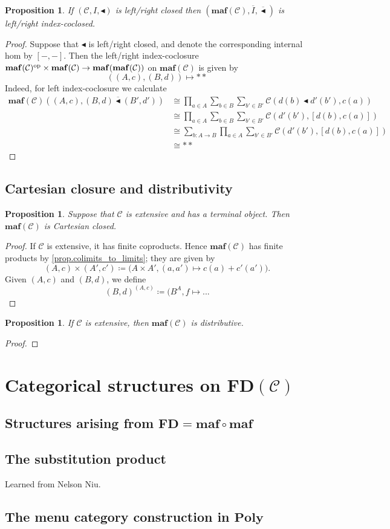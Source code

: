 \documentclass[11pt, one side, article]{memoir}
\theoremstyle{definition}
\theoremstyle{plain}
\newtheorem{proposition}[definitionx]{Proposition}
\newcommand{\cat}[1]{\mathcal{#1}}%
\newcommand{\Cat}[1]{\mathbf{#1}}%
\newcommand{\op}{^\tn{op}}
\newcommand{\tn}[1]{\textnormal{#1}}
\newcommand{\ol}[1]{\overline{#1}}
\newcommand{\poly}{\Cat{Poly}}
\newcommand{\0}{\Cat{0}}
\newcommand{\1}{\Cat{1}}
\newcommand{\olmonprod}{\mathbin{\ol{\monprod}}}
\newcommand{\monprod}{\blacktriangleleft}
\newcommand{\fd}{\Cat{FD}}
\newcommand{\opfam}{\Cat{maf}}
\begin{document}
\begin{proposition}
If $(\cat{C},I,\monprod)$ is left/right closed then $(\opfam(\cat{C}),\ol{I},\olmonprod)$ is left/right index-coclosed.
\end{proposition}
\begin{proof}
Suppose that $\monprod$ is left/right closed, and denote the corresponding internal hom by $[-,-]$. Then the left/right index-coclosure $\opfam(\cat{C})\op\times\opfam(\cat{C})\to\opfam(\opfam(\cat{C}))$ on $\opfam(\cat{C})$ is given by
\[
((A,c),(B,d))\mapsto**
\]
Indeed, for left index-coclosure we calculate
\begin{align*}
  \opfam(\cat{C})((A,c),(B,d)\olmonprod(B',d'))&\cong
  \prod_{a\in A}\sum_{b\in B}\sum_{b'\in B'}\cat{C}(d(b)\monprod d'(b'), c(a))\\&\cong
  \prod_{a\in A}\sum_{b\in B}\sum_{b'\in B'}\cat{C}(d'(b'), [d(b),c(a)])\\&\cong
  \sum_{b\colon A\to B}\prod_{a\in A}\sum_{b'\in B'}\cat{C}(d'(b'), [d(b),c(a)])\\&\cong
**
\end{align*}
\end{proof}

\section{Cartesian closure and distributivity}

\begin{proposition}
Suppose that $\cat{C}$ is extensive and has a terminal object. Then $\opfam(\cat{C})$ is Cartesian closed.
\end{proposition}
\begin{proof}
If $\cat{C}$ is extensive, it has finite coproducts. Hence $\opfam(\cat{C})$ has finite products by \cref{prop.colimits_to_limits}; they are given by
\[
(A,c)\times (A',c')\coloneqq\big(A\times A', (a,a')\mapsto c(a)+c'(a')\big).
\]
Given $(A,c)$ and $(B,d)$, we define
\[
(B,d)^{(A,c)}\coloneqq(B^A, f\mapsto ...
\]
\end{proof}

\begin{proposition}
If $\cat{C}$ is extensive, then $\opfam(\cat{C})$ is distributive.
\end{proposition}
\begin{proof}

\end{proof}

\chapter{Categorical structures on $\fd(\cat{C})$}
\section{Structures arising from $\fd=\opfam\circ\opfam$}
\section{The substitution product}

Learned from Nelson Niu.

\section{The menu category construction in $\poly$}



\printbibliography
\end{document}
